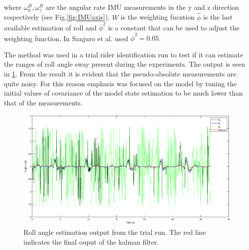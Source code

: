 where \ensuremath{\omega_{y}^{B},\omega_{z}^{B}} are the angular rate IMU measurements in the y and z direction respectively (see Fig.\ref{fig:IMUaxis}), \ensuremath{W } is the weighting fucntion  \ensuremath{\hat{\phi}} is the last available estimation of roll and \ensuremath{\overline{\phi}^2} is a constant that can be used to adjust the weighting function. In \cite{sanjurjo2018roll} Sanjuro et al. used  \ensuremath{\overline{\phi}^2=0.05}.

 The method was used in a trial rider identification run to test if it can estimate the ranges of roll angle sway present during the experiments. The output is seen in  \cref{fig:rollangleobserverplot}. From the result it is evident that the pseudo-absolute measurements are  quite noisy. For this reason emphasis was focused on the model by tuning the initial values of covariance of the model state estimation to be much lower than that of the measurements.

 \begin{figure}[h]
    \centering
    \captionsetup{justification=centering,margin=2cm}
    \includegraphics[scale=0.4]{images/rollangle_plot.eps}
        \caption[Short title]{Roll angle estimation output from the trial run. The red line indicates the final ouput of the kalman filter.}
    \label{fig:rollangleobserverplot}
\end{figure}
